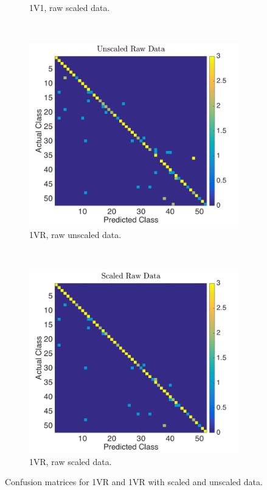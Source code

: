 \documentclass[a4paper, 10pt, conference]{ieeeconf}
\begin{document}
\begin{figure}[!ht]
\begin{subfigure}{0.2\textwidth}
          \caption{1V1, raw scaled data.}
        \end{subfigure}
        \\
        \begin{subfigure}{0.2\textwidth}
          \includegraphics[width=\textwidth]{src/1vr_raw_unscaled.png}
          \caption{1VR, raw unscaled data.}
        \end{subfigure}
        ~
        \begin{subfigure}{0.2\textwidth}
          \includegraphics[width=\textwidth]{src/1vr_raw_scaled.png}
          \caption{1VR, raw scaled data.}
        \end{subfigure}
	\caption{Confusion matrices for 1VR and 1VR with scaled and unscaled data.} \label{fig:svmconfuse}
\end{figure}
\end{document}
